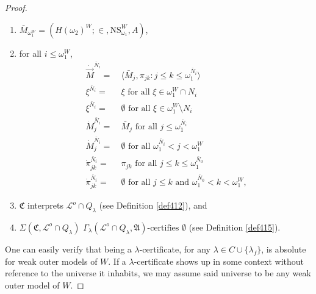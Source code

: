 \documentclass[12pt]{article}
\numberwithin{equation}{section}
\begin{document}
\begin{proof}
\begin{defi}
\begin{enumerate}[label=(C\arabic*)$_{\lambda}$, leftmargin=40pt]
    \item\label{cd7} $\bar{M}_{\omega_1^W} = (H(\omega_2)^W; \in, \mathrm{NS}_{\omega_1}^W, A)$,
    \item\label{2ndlast} for all $i \leq \omega_1^W$, 
    \begin{align*}
         \dot{\Vec{M}}^{\bar{N}_i} = \ & \langle \bar{M}_j, \pi_{jk} : j \leq k \leq \omega_1^{\bar{N}_i} \rangle \\
         \xi^{\bar{N}_i} = \ & \xi \text{ for all } \xi \in \omega_1^W \cap N_i \\
         \xi^{\bar{N}_i} = \ & \emptyset \text{ for all } \xi \in \omega_1^W \setminus N_i \\
         \dot{M}_j^{\bar{N}_i} = \ & \bar{M}_j \text{ for all } j \leq \omega_1^{\bar{N}_i} \\
         \dot{M}_j^{\bar{N}_i} = \ & \emptyset \text{ for all } \omega_1^{\bar{N}_i} < j < \omega_1^W \\
         \dot{\pi}_{jk}^{\bar{N}_i} = \ & \pi_{jk} \text{ for all } j \leq k \leq \omega_1^{\bar{N}_0} \\
         \dot{\pi}_{jk}^{\bar{N}_i} = \ & \emptyset \text{ for all } j \leq k \text{ and } \omega_1^{\bar{N}_0} < k < \omega_1^W \text{,}
    \end{align*}
    \item\label{cdlast} $\mathfrak{C}$ interprets $\mathcal{L}^o \cap Q_{\lambda}$ (see Definition \ref{def412}), and
    \item\label{cdrlast} $\Sigma(\mathfrak{C}, \mathcal{L}^o \cap Q_{\lambda})$ $\Gamma_{\lambda} (\mathcal{L}^o \cap Q_{\lambda}, \mathfrak{A}) \text{-certifies } \emptyset$ (see Definition \ref{def415}).
\end{enumerate}
\end{defi}

One can easily verify that being a $\lambda$-certificate, for any $\lambda \in C \cup \{\lambda_f\}$, is absolute for weak outer models of $W$. If a $\lambda$-certificate shows up in some context without reference to the universe it inhabits, we may assume said universe to be any weak outer model of $W$.


\end{proof}
\end{document}

